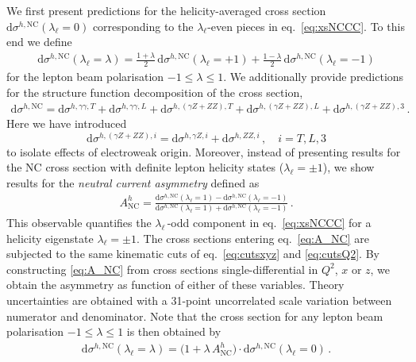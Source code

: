 \documentclass[11pt,a4paper]{article}
\newcommand{\dd}{\mathrm{d}}
\newcommand{\NC}{\mathrm{NC}}
\begin{document}
We first present predictions for the helicity-averaged cross section $\dd \sigma^{h,\NC} (\lambda_\ell = 0)$ corresponding to the $\lambda_\ell$-even pieces in eq.~\eqref{eq:xsNCCC}.
To this end we define
\begin{align}
\dd \sigma^{h,\NC}(\lambda_\ell=\lambda) = \frac{1+\lambda}{2} \, \dd \sigma^{h,\NC}(\lambda_\ell=+1) + \frac{1-\lambda}{2} \, \dd \sigma^{h,\NC}(\lambda_\ell=-1)
\end{align}
for the lepton beam polarisation $-1\leq \lambda \leq 1$.
We additionally provide predictions for the structure function decomposition of the cross section,
\begin{align}\label{eq:xsNCCC_dec}
  \dd \sigma^{h,\NC} = \dd \sigma^{h,\gamma\gamma, T} + \dd \sigma^{h,\gamma\gamma, L}
  +\dd \sigma^{h,(\gamma Z+ZZ), T} + \dd \sigma^{h,(\gamma Z+ZZ), L} + \dd \sigma^{h,(\gamma Z+ZZ), 3} \,.
\end{align}
Here we have introduced
\begin{equation}
  \dd \sigma^{h,(\gamma Z+ZZ), i}=\dd \sigma^{h,\gamma Z, i} + \dd \sigma^{h,ZZ, i} \,,  \quad i = T,L,3
\end{equation}
to isolate effects of electroweak origin.
Moreover, instead of presenting results for the NC cross section with definite lepton helicity states ($\lambda_\ell=\pm 1$),
we show results for the \emph{neutral current asymmetry} defined as
\begin{align}\label{eq:A_NC}
A^h_\NC = \frac{\dd \sigma^{h,\NC} (\lambda_{\ell}=1) - \dd \sigma^{h,\NC} (\lambda_{\ell}=-1)}{\dd \sigma^{h,\NC} (\lambda_{\ell}=1) + \dd \sigma^{h,\NC} (\lambda_{\ell}=-1)} \, .
\end{align}
This observable quantifies the $\lambda_\ell\,$-odd component in eq.~\eqref{eq:xsNCCC} for a helicity eigenstate $\lambda_\ell=\pm 1$.
%
The cross sections entering eq.~\eqref{eq:A_NC} are subjected to the same kinematic cuts of eq.~\eqref{eq:cutsxyz} and \eqref{eq:cutsQ2}.
By constructing \eqref{eq:A_NC} from cross sections single-differential in $Q^2$, $x$ or $z$, we obtain the asymmetry as
function of either of these variables.
Theory uncertainties are obtained with a 31-point uncorrelated scale variation between numerator and denominator.
%
Note that the cross section for any lepton beam polarisation $-1 \leq \lambda \leq 1$ is then obtained by
\begin{align}
\dd \sigma^{h,\NC} (\lambda_\ell = \lambda) = \big( 1 + \lambda \, A^h_\NC \big) \cdot \dd \sigma^{h,\NC} (\lambda_\ell =0) \, .
\end{align}
\end{document}
